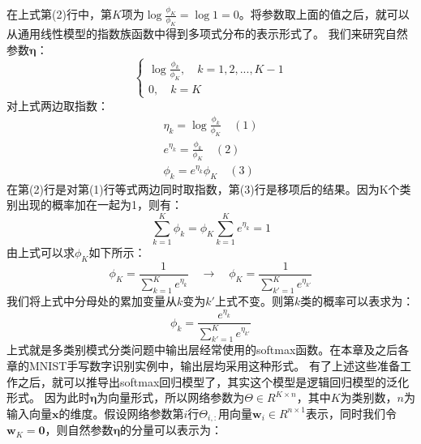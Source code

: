 \documentclass[UTF8]{article}
\begin{document}
在上式第(2)行中，第$K$项为$\log \frac{\phi _{K}}{\phi _{K}} = \log 1 = 0$。将参数取上面的值之后，就可以从通用线性模型的指数族函数中得到多项式分布的表示形式了。\newline
我们来研究自然参数$\boldsymbol{\eta}$：
\begin{equation}
\begin{cases}
\log \frac{\phi _{k}}{\phi _{K}}, \quad k=1,2,...,K-1 \\
0, \quad k=K
\end{cases}
\label{lcrn-softmax-regression-eta-deduction}
\end{equation}
对上式两边取指数：
\begin{equation}
\begin{aligned}
\eta _{k} = \log \frac{\phi _{k}}{\phi _{K}} \quad (1) \\
e^{\eta _{k}} = \frac{\phi _{k}}{\phi _{K}} \quad (2) \\
\phi _{k} = e^{\eta _{k}}{\phi _{K}} \quad (3)
\end{aligned}
\label{lcrn-softmax-regression-eta-deduction-1}
\end{equation}
在第(2)行是对第(1)行等式两边同时取指数，第(3)行是移项后的结果。因为K个类别出现的概率加在一起为1，则有：
\begin{equation}
\sum_{k=1}^{K} \phi _{k} = \phi _{K} \sum_{k=1}^{K} e^{\eta _{k}} = 1
\label{lcrn-softmax-regression-eta-deduction-2}
\end{equation}
由上式可以求$\phi _{K}$如下所示：
\begin{equation}
\phi _{K} = \frac{1}{\sum_{k=1}^{K} e^{\eta _{k}}} \quad \to \quad \phi _{K} = \frac{1}{\sum_{k'=1}^{K} e^{\eta _{k'}}}
\label{lcrn-softmax-regression-eta-deduction-3}
\end{equation}
我们将上式中分母处的累加变量从$k$变为$k'$上式不变。则第$k$类的概率可以表求为：
\begin{equation}
\phi _{k} = \frac{e^{\eta _{k}}}{\sum_{k'=1}^{K} e^{\eta _{k'}}}
\label{lcrn-softmax-regression-eta-deduction-4}
\end{equation}
上式就是多类别模式分类问题中输出层经常使用的softmax函数。在本章及之后各章的MNIST手写数字识别实例中，输出层均采用这种形式。\newline
有了上述这些准备工作之后，就可以推导出softmax回归模型了，其实这个模型是逻辑回归模型的泛化形式。\newline
因为此时$\boldsymbol{\eta}$为向量形式，所以网络参数为$\Theta \in R^{K \times n}$，其中$K$为类别数，$n$为输入向量$\boldsymbol{x}$的维度。假设网络参数第$i$行$\Theta _{i,:}$用向量$\boldsymbol{w}_{i} \in R^{n \times 1}$表示，同时我们令$\boldsymbol{w}_{K} = \boldsymbol{0}$，则自然参数$\boldsymbol{\eta}$的分量可以表示为：
\end{document}
